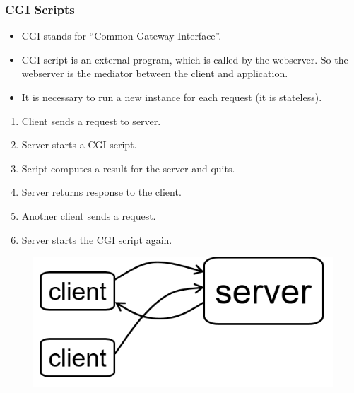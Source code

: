 \documentclass[10pt,xcolor=pdflatex]{beamer}
\begin{document}
\begin{frame}\frametitle{CGI Scripts}
	\begin{itemize}
    	\item CGI stands for “Common Gateway Interface”.
        \item CGI script is an external program, which is called by the webserver. So the webserver is the mediator between the client and application.
        \item It is necessary to run a new instance for each request (it is stateless). \newline
    \end{itemize}
	\begin{minipage}{0.6\textwidth}
    \begin{enumerate}
      \item Client sends a request to server.
      \item Server starts a CGI script.
      \item Script computes a result for the server and quits.
      \item Server returns response to the client.
      \item Another client sends a request.
      \item Server starts the CGI script again.
    \end{enumerate} \hfill
    \end{minipage}
	 \begin{minipage}{0.3\textwidth}
    \begin{figure}[H]
    \includegraphics[scale=0.55]{img/obr1}
    \end{figure}
    \end{minipage} \hfill
{}
\end{frame}
\end{document}
